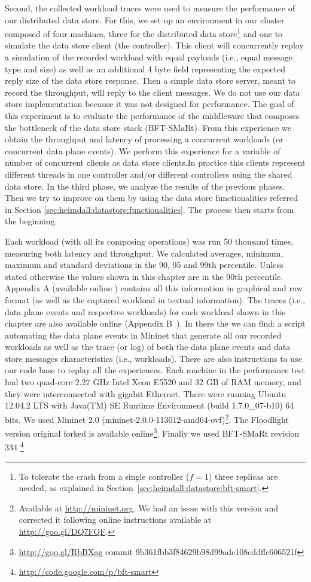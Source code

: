 \documentclass[12pt,openright,twoside]{report}
\begin{document}
Second, the collected workload traces were used to measure the performance of our distributed data store.
For this, we set up an environment in our cluster composed of four machines, three for the distributed data store\footnote{To tolerate the crash from a single controller ($f=1$) three replicas are needed, as explained in Section~\ref{sec:heimdall:datastore:bft-smart}.} and one to simulate the data store client (the controller). 
This client will concurrently replay a simulation of the recorded workload with equal payloads (i.e., equal message type and size) as well as an additional 4 byte field representing the expected reply size of the data store response. Then a simple data store server, meant to record the throughput, will reply to the client messages. We do not use our data store implementation because it was not designed for performance. The  goal of this experiment is to evaluate the performance of the middleware that  composes the bottleneck of the data store stack (BFT-SMaRt). 
From this experience we obtain the throughput and latency of processing a concurrent workloads (or concurrent data plane events).  We perform this experience for a variable of number of concurrent clients as data store clients.In practice this clients represent different threads in one controller and/or different controllers using the shared data store. 
In the third phase, we analyze the results of the previous phases. Then we try to improve on them by using the data store functionalities referred in Section \ref{sec:heimdall:datastore:functionalities}. The process then starts from the beginning.  

Each workload (with all its composing operations)  was run 50 thousand times, measuring both latency and throughput. 
We calculated averages, minimum, maximum and standard deviations in the 90, 95 and 99th percentile. 
Unless stated otherwise the values shown in this chapter are in the 90th percentile. Appendix A (available online \cite{support})  contains all this information in graphical and raw format (as well as the captured workload in textual information). The traces (i.e., data plane events and respective workloads) for each workload shown in this chapter are also available online (Appendix B~\cite{support}). 
In there the we can find: a script automating the data plane events in Mininet that generate all our recorded workloads as well as the trace (or log)  of both the data plane events and data store messages characteristics (i.e.,  workloads). 
There are also instructions to use our code base to replay all the experiences. 
Each machine in the performance test had two quad-core 2.27 GHz Intel Xeon E5520 and 32 GB of RAM memory, and they were interconnected with gigabit Ethernet. 
There were running  Ubuntu 12.04.2 LTS with  Java(TM) SE Runtime Environment (build 1.7.0\_07-b10) 64 bits.
 We used Mininet 2.0 (mininet-2.0.0-113012-amd64-ovf)\footnote{Available at \url{http://mininet.org}. We had an issue with this version and corrected it following online instructions available at \url{http://goo.gl/DQ7FQF}.}. 
The Floodlight version original forked  is available online\footnote{\url{http://goo.gl/RbBXag} commit 9b361fbb3f84629b98d99adc108cddffc606521f}. Finally we used BFT-SMaRt revision 334 \footnote{\url{http://code.google.com/p/bft-smart}} 
\end{document}
